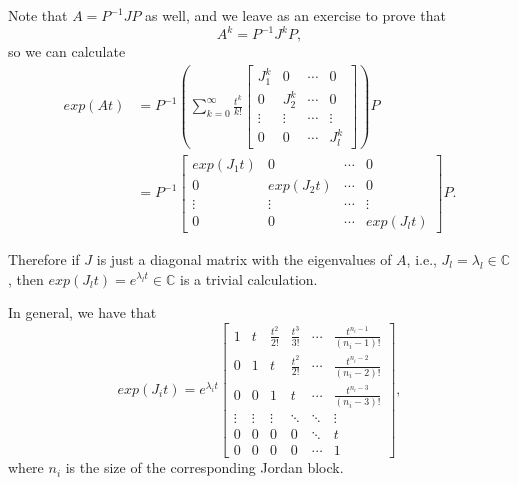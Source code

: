 \documentclass[11pt,a4paper,titlepage]{article}
\begin{document}
Note that $A = P^{-1}JP$ as well, and we leave as an exercise to prove that
\begin{equation}
	A^k = P^{-1} J^k P,
\end{equation}
so we can calculate
\begin{align}
	exp(At) &= P^{-1}\left(\sum_{k=0}^\infty \frac{t^k}{k!} \begin{bmatrix}J_1^k & 0 & \cdots & 0 \\ 0 & J_2^k & \cdots & 0 \\ \vdots & \vdots & \cdots & \vdots \\ 0 & 0 & \cdots & J_l^k \end{bmatrix} \right) P \nonumber \\
		&= P^{-1} \begin{bmatrix}exp(J_1t) & 0 & \cdots & 0 \\ 0 & exp(J_2t) & \cdots & 0 \\ \vdots & \vdots & \cdots & \vdots \\ 0 & 0 & \cdots & exp(J_lt) \end{bmatrix} P.
\end{align}

Therefore if $J$ is just a diagonal matrix with the eigenvalues of $A$, i.e., $J_l = \lambda_l \in \mathbb{C}$, then $exp(J_lt) = e^{\lambda_lt} \in\mathbb{C}$ is a trivial calculation.

In general, we have that
\begin{equation}
	exp(J_it) = e^{\lambda_i t}
	\begin{bmatrix}1 & t & \frac{t^2}{2!} & \frac{t^3}{3!} & \cdots & \frac{t^{n_i-1}}{(n_i-1)!} \\
		0 & 1 & t & \frac{t^2}{2!} & \cdots & \frac{t^{n_i-2}}{(n_i-2)!} \\
		0 & 0 & 1 & t & \cdots & \frac{t^{n_i-3}}{(n_i-3)!} \\
	\vdots & \vdots & \vdots & \ddots & \ddots & \vdots \\
	0 & 0 & 0 & 0 & \ddots & t \\
	0 & 0 & 0 & 0 & \cdots & 1
\end{bmatrix},
\end{equation}
where $n_i$ is the size of the corresponding Jordan block.
\end{document}
